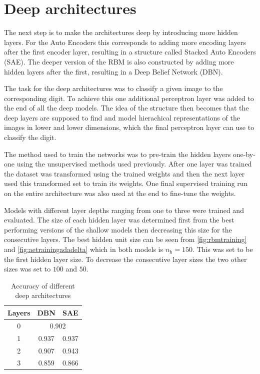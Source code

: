 \documentclass{article}
\begin{document}
\section{Deep architectures}
The next step is to make the architectures deep by introducing more hidden layers.
For the Auto Encoders this corresponds to adding more encoding layers after the first encoder layer,
resulting in a structure called Stacked Auto Encoders (SAE).
The deeper version of the RBM is also constructed by adding more hidden layers after the first,
resulting in a Deep Belief Network (DBN).

The task for the deep architectures was to classify a given image to the corresponding digit.
To achieve this one additional perceptron layer was added to the end of all the deep models.
The idea of the structure then becomes that the deep layers are supposed to find and model
hierachical representations of the images in lower and lower dimensions,
which the final perceptron layer can use to classify the digit.

The method used to train the networks was to pre-train the hidden layers one-by-one
using the unsupervised methods used previously.
After one layer was trained the dataset was transformed using the trained weights
and then the next layer used this transformed set to train its weights.
One final supervised training run on the entire architecture
was also used at the end to fine-tune the weights.

Models with different layer depths ranging from one to three were trained and evaluated.
The size of each hidden layer was determined first from the best performing versions 
of the shallow models then decreasing this size for the consecutive layers.
The best hidden unit size can be seen from  \cref{fig:rbmtraining} and \cref{fig:aetrainingadadelta}
which in both models is $n_{\text{h}} = 150$.
This was set to be the first hidden layer size.
To decrease the consecutive layer sizes the two other sizes was set to $100$ and $50$.

\begin{table}[!ht]
  \centering
  \caption{Accuracy of different deep architectures}
  \label{tab:accuracy}
  \begin{tabular}{ccc}
    Layers & DBN & SAE \\ \midrule
    0 & \multicolumn{2}{c}{0.902} \\
    1 & 0.937 & 0.937 \\
    2 & 0.907 & 0.943 \\
    3 & 0.859 & 0.866
  \end{tabular}
\end{table}
\end{document}
